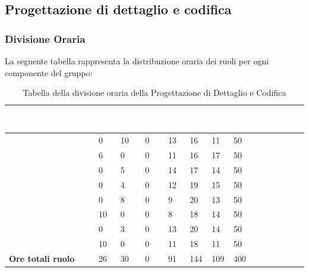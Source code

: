 \subsection{Progettazione di dettaglio e codifica}

\subsubsection{Divisione Oraria}
La seguente tabella rappresenta la distribuzione oraria dei ruoli per ogni componente del gruppo:
{
\renewcommand{\arraystretch}{2}
\centering
\begin{longtable}[h!] { C{4cm} C{1cm} C{1cm} C{1cm} C{1cm} C{1cm} C{1cm} C{3cm}}
\caption{Tabella della divisione oraria della Progettazione di Dettaglio e Codifica}\\

\textcolor{white}{\textbf{Membro del gruppo}} & 
\textcolor{white}{\textbf{RE}} & 
\textcolor{white}{\textbf{AM}} & 
\textcolor{white}{\textbf{AN}} & 
\textcolor{white}{\textbf{PT}} & 
\textcolor{white}{\textbf{PR}} & 
\textcolor{white}{\textbf{VE}} & 
\textcolor{white}{\textbf{Ore complessive}}\\
\endhead

\MC{}                     &  0 & 10 & 0 & 13 &  16 &  11 &  50 \\
\LD{}                     &  6 &  0 & 0 & 11 &  16 &  17 &  50 \\
\CE{}                     &  0 &  5 & 0 & 14 &  17 &  14 &  50 \\
\SE{}                     &  0 &  4 & 0 & 12 &  19 &  15 &  50 \\
\PF{}                     &  0 &  8 & 0 &  9 &  20 &  13 &  50 \\
\DF{}                     & 10 &  0 & 0 &  8 &  18 &  14 &  50 \\
\BR{}                     &  0 &  3 & 0 & 13 &  20 &  14 &  50 \\
\AT{}                     & 10 &  0 & 0 & 11 &  18 &  11 &  50 \\
\textbf{Ore totali ruolo} & 26 & 30 & 0 & 91 & 144 & 109 & 400 \\

\end{longtable}
}

